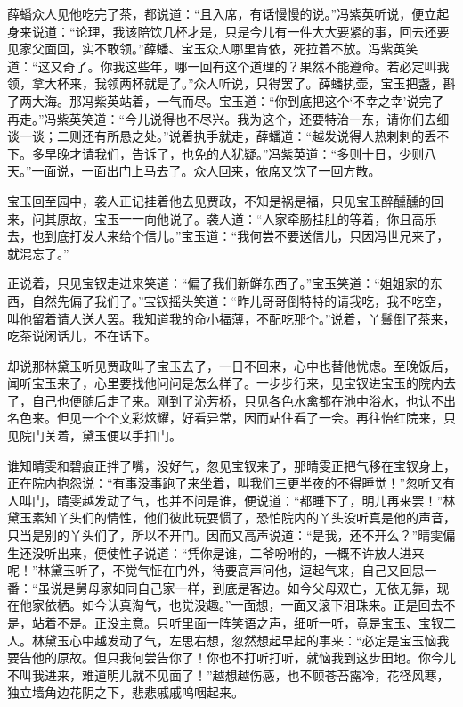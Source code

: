 \documentclass[12pt,oneside]{book}
\begin{document}
薛蟠众人见他吃完了茶，都说道：“且入席，有话慢慢的说。”冯紫英听说，便立起身来说道：“论理，我该陪饮几杯才是，只是今儿有一件大大要紧的事，回去还要见家父面回，实不敢领。”薛蟠、宝玉众人哪里肯依，死拉着不放。冯紫英笑道：“这又奇了。你我这些年，哪一回有这个道理的？果然不能遵命。若必定叫我领，拿大杯来，我领两杯就是了。”众人听说，只得罢了。薛蟠执壶，宝玉把盏，斟了两大海。那冯紫英站着，一气而尽。宝玉道：“你到底把这个‘不幸之幸’说完了再走。”冯紫英笑道：“今儿说得也不尽兴。我为这个，还要特治一东，请你们去细谈一谈；二则还有所恳之处。”说着执手就走，薛蟠道：“越发说得人热剌剌的丢不下。多早晚才请我们，告诉了，也免的人犹疑。”冯紫英道：“多则十日，少则八天。”一面说，一面出门上马去了。众人回来，依席又饮了一回方散。

宝玉回至园中，袭人正记挂着他去见贾政，不知是祸是福，只见宝玉醉醺醺的回来，问其原故，宝玉一一向他说了。袭人道：“人家牵肠挂肚的等着，你且高乐去，也到底打发人来给个信儿。”宝玉道：“我何尝不要送信儿，只因冯世兄来了，就混忘了。”

正说着，只见宝钗走进来笑道：“偏了我们新鲜东西了。”宝玉笑道：“姐姐家的东西，自然先偏了我们了。”宝钗摇头笑道：“昨儿哥哥倒特特的请我吃，我不吃空，叫他留着请人送人罢。我知道我的命小福薄，不配吃那个。”说着，丫鬟倒了茶来，吃茶说闲话儿，不在话下。

却说那林黛玉听见贾政叫了宝玉去了，一日不回来，心中也替他忧虑。至晚饭后，闻听宝玉来了，心里要找他问问是怎么样了。一步步行来，见宝钗进宝玉的院内去了，自己也便随后走了来。刚到了沁芳桥，只见各色水禽都在池中浴水，也认不出名色来。但见一个个文彩炫耀，好看异常，因而站住看了一会。再往怡红院来，只见院门关着，黛玉便以手扣门。

谁知晴雯和碧痕正拌了嘴，没好气，忽见宝钗来了，那晴雯正把气移在宝钗身上，正在院内抱怨说：“有事没事跑了来坐着，叫我们三更半夜的不得睡觉！”忽听又有人叫门，晴雯越发动了气，也并不问是谁，便说道：“都睡下了，明儿再来罢！”林黛玉素知丫头们的情性，他们彼此玩耍惯了，恐怕院内的丫头没听真是他的声音，只当是别的丫头们了，所以不开门。因而又高声说道：“是我，还不开么？”晴雯偏生还没听出来，便使性子说道：“凭你是谁，二爷吩咐的，一概不许放人进来呢！”林黛玉听了，不觉气怔在门外，待要高声问他，逗起气来，自己又回思一番：“虽说是舅母家如同自己家一样，到底是客边。如今父母双亡，无依无靠，现在他家依栖。如今认真淘气，也觉没趣。”一面想，一面又滚下泪珠来。正是回去不是，站着不是。正没主意。只听里面一阵笑语之声，细听一听，竟是宝玉、宝钗二人。林黛玉心中越发动了气，左思右想，忽然想起早起的事来：“必定是宝玉恼我要告他的原故。但只我何尝告你了！你也不打听打听，就恼我到这步田地。你今儿不叫我进来，难道明儿就不见面了！”越想越伤感，也不顾苍苔露冷，花径风寒，独立墙角边花阴之下，悲悲戚戚呜咽起来。
\end{document}
